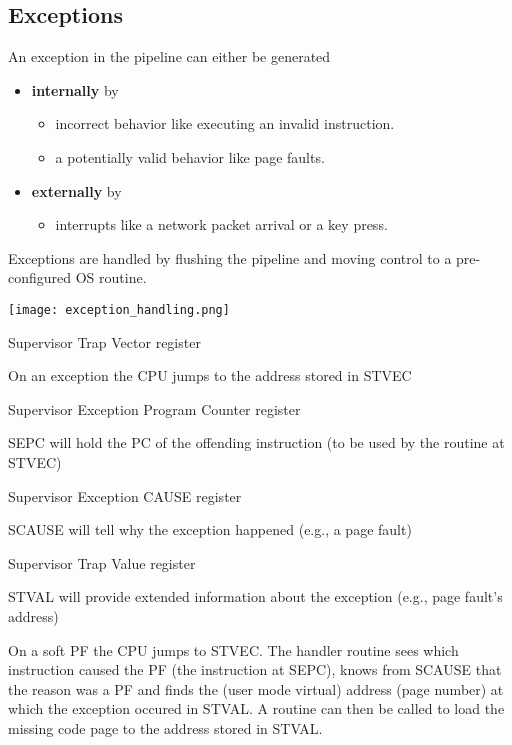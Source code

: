 \subsection{Exceptions}\label{exceptions}
An exception in the pipeline can either be generated
\begin{itemize}
    \item \textbf{internally} by
          \begin{itemize}
              \item incorrect behavior like executing an invalid instruction.
              \item a potentially valid behavior like page faults.
          \end{itemize}
    \item \textbf{externally} by
          \begin{itemize}
              \item interrupts like a network packet arrival or a key press.
          \end{itemize}
\end{itemize}

Exceptions are handled by flushing the pipeline and moving control to a pre-configured OS routine.

\begin{center}
    \texttt{[image: exception\_handling.png]}
\end{center}

\newpar{}
 Supervisor Trap Vector register

On an exception the CPU jumps to the address stored in STVEC

\newpar{}
 Supervisor Exception Program Counter register

SEPC will hold the PC of the offending instruction (to be used by the routine at STVEC)

\newpar{}
 Supervisor Exception CAUSE register

SCAUSE will tell why the exception happened (e.g., a page fault)

\newpar{}
 Supervisor Trap Value register

STVAL will provide extended information about the exception (e.g., page fault's address)

\newpar{}

On a soft PF the CPU jumps to STVEC. The handler routine sees which instruction caused the PF (the instruction at SEPC), knows from SCAUSE that the reason was a PF and finds the (user mode virtual) address (page number) at which the exception occured in STVAL. A routine can then be called to load the missing code page to the address stored in STVAL.